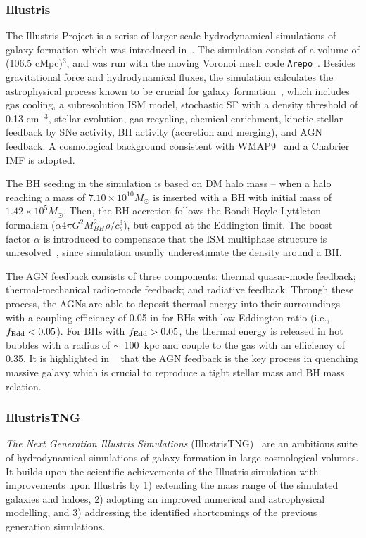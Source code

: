 \documentclass[twocolumn]{aastex631}
\begin{document}
\subsubsection{Illustris}
The Illustris Project is a serise of larger-scale hydrodynamical simulations of galaxy formation which was introduced in~\citet{2014MNRAS.444.1518V, 2014Natur.509..177V}. The simulation consist of a volume of (106.5 cMpc)$^3$, and was run with the moving Voronoi mesh code {\tt Arepo}~\citep{2010MNRAS.401..791S}. Besides gravitational force and hydrodynamical fluxes, the simulation calculates the astrophysical process known to be crucial for galaxy formation~\citep{2013MNRAS.436.3031V, 2014MNRAS.438.1985T}, which includes gas cooling, a subresolution ISM model, stochastic SF with a density threshold of 0.13 cm$^{-3}$, stellar evolution, gas recycling, chemical enrichment, kinetic stellar feedback by SNe activity, BH activity (accretion and merging), and AGN feedback. A cosmological background consistent with WMAP9~\citep{2013ApJS..208...19H} and a Chabrier IMF is adopted.

The BH seeding in the simulation is based on DM halo mass -- when a halo reaching a mass of $7.10 \times 10^{10} M_{\odot}$ is inserted with a BH with initial mass of $1.42 \times 10^5 M_{\odot}$. Then, the BH accretion follows the Bondi-Hoyle-Lyttleton formalism ($\alpha4\pi G^2M_{BH}^2 \rho/c_s^3$), but capped at the Eddington limit. The boost factor $\alpha$ is introduced to compensate that the ISM multiphase structure is unresolved~\citep{Springel2005, 2009MNRAS.398...53B}, since simulation usually underestimate the density around a BH.

The AGN feedback consists of three components: thermal quasar-mode feedback; thermal-mechanical radio-mode feedback; and radiative feedback. Through these process, the AGNs are able to deposit thermal energy into their surroundings with a coupling efficiency of 0.05 in for BHs with low Eddington ratio (i.e., $f_{\rm Edd} < 0.05$). For BHs with $f_{\rm Edd} > 0.05$, the thermal energy is released in hot bubbles with a radius of $\sim$ 100~kpc and couple to the gas with an efficiency of 0.35. It is highlighted in ~\citet{2014MNRAS.444.1518V} that the AGN feedback is the key process in quenching massive galaxy which is crucial to reproduce a tight stellar mass and BH mass relation. 

\subsubsection{IllustrisTNG}
{\it The Next Generation Illustris Simulations} (IllustrisTNG)~\citep{2018MNRAS.475..676S, Pillepich2018} are an ambitious suite of hydrodynamical simulations of galaxy formation in large cosmological volumes. It builds upon the scientific achievements of the Illustris simulation with improvements upon Illustris by 1) extending the mass range of the simulated galaxies and haloes, 2) adopting an improved numerical and astrophysical modelling, and 3) addressing the identified shortcomings of the previous generation simulations.
\end{document}
